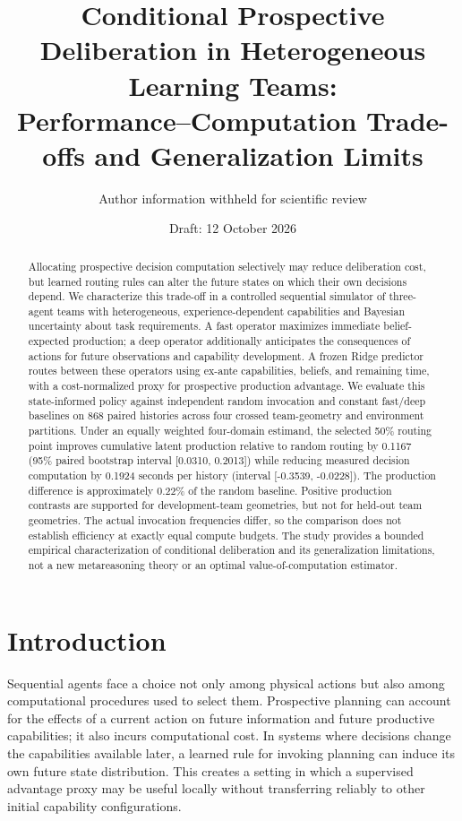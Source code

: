\documentclass[11pt]{article}
\title{Conditional Prospective Deliberation in Heterogeneous Learning Teams:\\Performance--Computation Trade-offs and Generalization Limits}
\author{Author information withheld for scientific review}
\date{Draft: 12 October 2026}
\begin{document}
\maketitle
\begin{abstract}
Allocating prospective decision computation selectively may reduce deliberation cost, but learned routing rules can alter the future states on which their own decisions depend. We characterize this trade-off in a controlled sequential simulator of three-agent teams with heterogeneous, experience-dependent capabilities and Bayesian uncertainty about task requirements. A fast operator maximizes immediate belief-expected production; a deep operator additionally anticipates the consequences of actions for future observations and capability development. A frozen Ridge predictor routes between these operators using ex-ante capabilities, beliefs, and remaining time, with a cost-normalized proxy for prospective production advantage. We evaluate this state-informed policy against independent random invocation and constant fast/deep baselines on 868 paired histories across four crossed team-geometry and environment partitions. Under an equally weighted four-domain estimand, the selected 50\% routing point improves cumulative latent production relative to random routing by 0.1167 (95\% paired bootstrap interval [0.0310, 0.2013]) while reducing measured decision computation by 0.1924 seconds per history (interval [-0.3539, -0.0228]). The production difference is approximately 0.22\% of the random baseline. Positive production contrasts are supported for development-team geometries, but not for held-out team geometries. The actual invocation frequencies differ, so the comparison does not establish efficiency at exactly equal compute budgets. The study provides a bounded empirical characterization of conditional deliberation and its generalization limitations, not a new metareasoning theory or an optimal value-of-computation estimator.
\end{abstract}
\section{Introduction}
Sequential agents face a choice not only among physical actions but also among computational procedures used to select them. Prospective planning can account for the effects of a current action on future information and future productive capabilities; it also incurs computational cost. In systems where decisions change the capabilities available later, a learned rule for invoking planning can induce its own future state distribution. This creates a setting in which a supervised advantage proxy may be useful locally without transferring reliably to other initial capability configurations.
\end{document}
